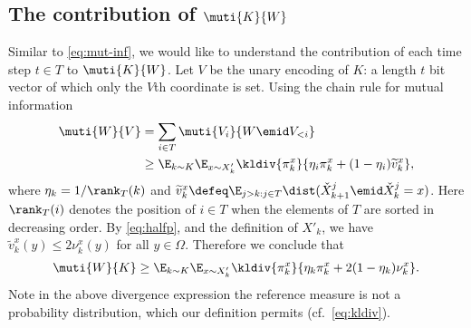 \subsection{The contribution of $\muti{K}{W}$}
Similar to \autoref{eq:mut-inf}, we would like to understand
the contribution of each time step $t\in T$ to 
$\muti{K}{W}$. Let $V$ be the unary encoding of $K$:
a length $t$ bit vector of which only the $V$th 
coordinate is set. Using the chain rule for 
mutual information
\begin{align*}
\muti{W}{V} &=   \sum_{i\in T}\muti{V_i}{W\emid V_{<i}}\\
            &\ge \E_{k\sim K} \E_{x\sim X'_k} 
                 \kldiv{\pi_k^x}
           {\eta_i \pi_k^x + (1-\eta_i)\widetilde{v}_k^x},
\end{align*}
where $\eta_k = 1/\rank_{T}(k)$ and 
$\widetilde{v}_k^x 
    \defeq \E_{j > k : j\in T} 
    \dist(\check{X}^j_{k+1}\emid \check{X}^j_k = x)$.
Here $\rank_T(i)$ denotes the position of 
$i\in T$ when the elements of $T$ are sorted in decreasing order.
By \autoref{eq:halfp}, and the definition of
$X'_k$, we have
$\widetilde{v}_k^x(y)\le 2\nu_k^x(y)$ for all $y\in \Omega$.
Therefore we conclude that 
\begin{align}
\muti{W}{K} \ge \E_{k\sim K} \E_{x\sim X'_k} 
                 \kldiv{\pi_k^x}
           {\eta_k \pi_k^x + 2(1-\eta_k)\nu_k^x}.\label{eq:muti-nu}
\end{align}
Note in the above divergence expression the 
reference measure is not a probability distribution, 
which our definition permits (cf.\ \autoref{eq:kldiv}).

